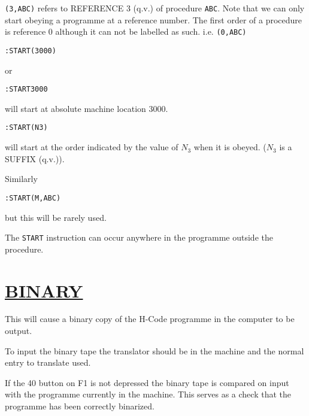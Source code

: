 \documentclass[10pt, a4paper, oneside]{article}
\newcommand{\myuline}[1]{\uline{#1}}
\newcommand{\mytt}[1]{\texttt{\scriptsize #1}}
\newcommand{\mytt}[1]{\texttt{\small #1}}
\begin{document}
\begin{multicols}{2}
\mytt{(3,ABC)} refers to REFERENCE 3 (q.v.) of procedure
\mytt{ABC}.  Note that we can only start obeying a programme
at a reference number.  The first order of a procedure
is reference 0 although it can not be labelled as such.
i.e. \mytt{(0,ABC)}

\begin{addmargin}[1cm]{1em}%
\begin{lstlisting}
:START(3000)
\end{lstlisting}
\end{addmargin}

or
\begin{addmargin}[1cm]{1em}%
\begin{lstlisting}
:START3000
\end{lstlisting}
\end{addmargin}

will start at absolute machine location 3000.

\begin{addmargin}[1cm]{1em}%
\begin{lstlisting}
:START(N3)
\end{lstlisting}
\end{addmargin}

will start at the order indicated by the value of $N_{3}$
when it is obeyed.  ($N_{3}$ is a SUFFIX (q.v.)).

Similarly

\begin{addmargin}[1cm]{1em}%
\begin{lstlisting}
:START(M,ABC)
\end{lstlisting}
\end{addmargin}

\begin{flushleft}
but this will be rarely used.
\end{flushleft}

The \mytt{START} instruction can occur anywhere in the
programme outside the procedure.

\section{\myuline{BINARY}}

This will cause a binary copy of the H-Code
programme in the computer to be output.

To input the binary tape the translator should be
in the machine and the normal entry to translate used.

If the 40 button on F1 is not depressed the
binary tape is compared on input with the programme
currently in the machine.  This serves as a check that
the programme has been correctly binarized.


\end{multicols}
\end{document}
